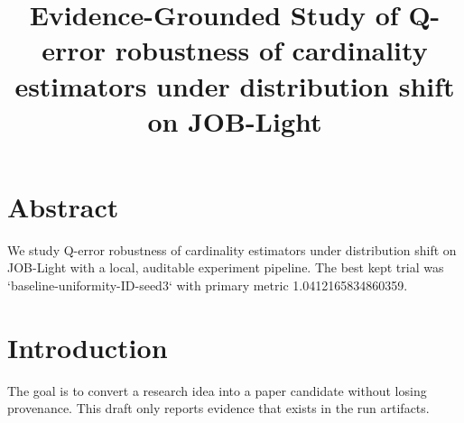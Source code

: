 \documentclass{article}
\begin{document}
\title{Evidence-Grounded Study of Q-error robustness of cardinality estimators under distribution shift on JOB-Light}
\maketitle

\section{Abstract}
We study Q-error robustness of cardinality estimators under distribution shift on JOB-Light with a local, auditable experiment pipeline. The best kept trial was `baseline-uniformity-ID-seed3` with primary metric 1.0412165834860359.

\section{Introduction}
The goal is to convert a research idea into a paper candidate without losing provenance.
This draft only reports evidence that exists in the run artifacts.
\end{document}
